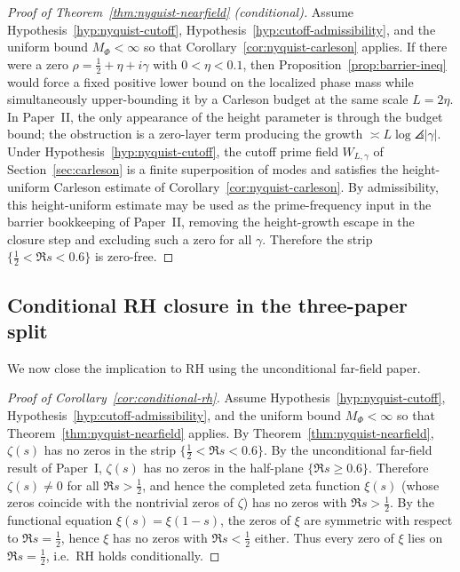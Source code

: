 \documentclass[11pt]{article}
\begin{document}
\begin{proof}[Proof of Theorem~\ref{thm:nyquist-nearfield} (conditional)]
Assume Hypothesis~\ref{hyp:nyquist-cutoff}, Hypothesis~\ref{hyp:cutoff-admissibility}, and the uniform bound $M_\Phi<\infty$ so that Corollary~\ref{cor:nyquist-carleson} applies.
If there were a zero $\rho=\tfrac12+\eta+i\gamma$ with $0<\eta<0.1$, then Proposition~\ref{prop:barrier-ineq} would force a fixed positive lower bound on the localized phase mass while simultaneously upper-bounding it by a Carleson budget at the same scale $L=2\eta$.
In Paper~II, the only appearance of the height parameter is through the budget bound; the obstruction is a zero-layer term producing the growth $\asymp L\log\angles{|\gamma|}$.
Under Hypothesis~\ref{hyp:nyquist-cutoff}, the cutoff prime field $W_{L,\gamma}$ of Section~\ref{sec:carleson} is a finite superposition of modes and satisfies the height-uniform Carleson estimate of Corollary~\ref{cor:nyquist-carleson}.
By admissibility, this height-uniform estimate may be used as the prime-frequency input in the barrier bookkeeping of Paper~II, removing the height-growth escape in the closure step and excluding such a zero for all $\gamma$.
Therefore the strip $\{\tfrac12<\Re s<0.6\}$ is zero-free.
\end{proof}

\subsection*{Conditional RH closure in the three-paper split}
We now close the implication to RH using the unconditional far-field paper.

\begin{proof}[Proof of Corollary~\ref{cor:conditional-rh}]
Assume Hypothesis~\ref{hyp:nyquist-cutoff}, Hypothesis~\ref{hyp:cutoff-admissibility}, and the uniform bound $M_\Phi<\infty$ so that Theorem~\ref{thm:nyquist-nearfield} applies.
By Theorem~\ref{thm:nyquist-nearfield}, $\zeta(s)$ has no zeros in the strip $\{\tfrac12<\Re s<0.6\}$.
By the unconditional far-field result of Paper~I, $\zeta(s)$ has no zeros in the half-plane $\{\Re s\ge 0.6\}$.
Therefore $\zeta(s)\neq 0$ for all $\Re s>\tfrac12$, and hence the completed zeta function $\xi(s)$ (whose zeros coincide with the nontrivial zeros of $\zeta$) has no zeros with $\Re s>\tfrac12$.
By the functional equation $\xi(s)=\xi(1-s)$, the zeros of $\xi$ are symmetric with respect to $\Re s=\tfrac12$, hence $\xi$ has no zeros with $\Re s<\tfrac12$ either.
Thus every zero of $\xi$ lies on $\Re s=\tfrac12$, i.e.\ RH holds conditionally.
\end{proof}
\end{document}
